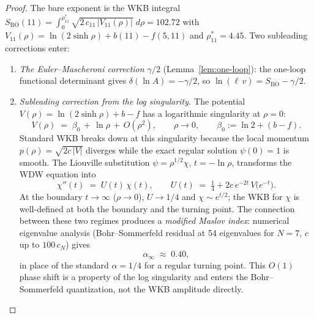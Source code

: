 \begin{proof}
The bare exponent is the WKB integral
$S_{\mathrm{BO}}(11) = \int_0^{\rho^*_{11}}
  \sqrt{2\,c_{11}\,|V_{11}(\rho)|}\;d\rho = 102.72$
with $V_{11}(\rho) = \ln(2\sinh\rho) + b(11) - f(5,11)$ and
$\rho^*_{11} = 4.45$.
Two subleading corrections enter:
\begin{enumerate}
\item \emph{The Euler--Mascheroni correction $\gamma/2$}
  (Lemma~\ref{lem:one-loop}):
  the one-loop functional determinant gives
  $\delta(\ln A) = -\gamma/2$,
  so $\ln(\ell\,v) = S_{\mathrm{BO}} - \gamma/2$.
\item \emph{Subleading correction from the log singularity.}
  The potential $V(\rho) = \ln(2\sinh\rho) + b{-}f$ has a
  logarithmic singularity at $\rho = 0$:
  \begin{equation}\label{eq:V-near-zero}
    V(\rho) \;=\; \beta_0 \,+\, \ln\rho
    \,+\, O(\rho^2),
    \qquad \rho \to 0,
    \qquad \beta_0 := \ln 2 + (b{-}f).
  \end{equation}
  Standard WKB breaks down at this singularity because
  the local momentum $p(\rho) = \sqrt{2c\,|V|}$ diverges
  while the exact regular solution $\psi(0) = 1$ is smooth.
  The Liouville substitution $\psi = \rho^{1/2}\chi$,
  $t = -\!\ln\rho$, transforms the WDW equation into
  \begin{equation}\label{eq:chi-equation}
    \chi''(t) \;=\; U(t)\,\chi(t),
    \qquad
    U(t) \;=\; \tfrac{1}{4}
      + 2c\,e^{-2t}\,V\!\bigl(e^{-t}\bigr).
  \end{equation}
  At the boundary $t \to \infty$ ($\rho \to 0$),
  $U \to 1/4$ and $\chi \sim e^{t/2}$; the WKB for $\chi$
  is well-defined at both the boundary and the turning point.
  The connection between these two regimes produces a
  \emph{modified Maslov index}: numerical eigenvalue
  analysis (Bohr--Sommerfeld residual at 54 eigenvalues
  for $N = 7$, $c$ up to $100\,c_N$) gives
  \begin{equation}\label{eq:langer-shift}
    \alpha_{\infty}
      \;\approx\; 0.40,
  \end{equation}
  in place of the standard $\alpha = 1/4$ for a
  regular turning point.  This $O(1)$ phase shift
  is a property of the log singularity and enters the
  Bohr--Sommerfeld quantization, not the WKB amplitude
  directly.


\end{enumerate}
\end{proof}
